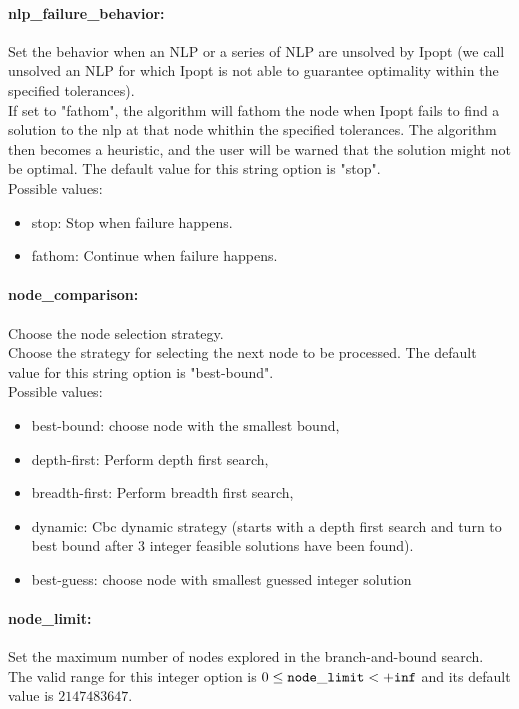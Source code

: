 \paragraph{nlp\_failure\_behavior:}\label{sec:nlp_failure_behavior} Set the behavior when an NLP or a series of NLP are unsolved by Ipopt (we call unsolved an NLP for which Ipopt is not able to guarantee optimality within the specified tolerances). $\;$ \\
 If set to "fathom", the algorithm will fathom the
node when Ipopt fails to find a solution to the
nlp at that node whithin the specified
tolerances. The algorithm then becomes a
heuristic, and the user will be warned that the
solution might not be optimal.
The default value for this string option is "stop".
\\ 
Possible values:
\begin{itemize}
   \item stop: Stop when failure happens.
   \item fathom: Continue when failure happens.
\end{itemize}

\paragraph{node\_comparison:}\label{sec:node_comparison} Choose the node selection strategy. $\;$ \\
 Choose the strategy for selecting the next node
to be processed.
The default value for this string option is "best-bound".
\\ 
Possible values:
\begin{itemize}
   \item best-bound: choose node with the smallest bound,
   \item depth-first: Perform depth first search,
   \item breadth-first: Perform breadth first search,
   \item dynamic: Cbc dynamic strategy (starts with a depth first
search and turn to best bound after 3 integer
feasible solutions have been found).
   \item best-guess: choose node with smallest guessed integer
solution
\end{itemize}

\paragraph{node\_limit:}\label{sec:node_limit} Set the maximum number of nodes explored in the branch-and-bound search. $\;$ \\
 The valid range for this integer option is
$0 \le {\tt node\_limit } <  {\tt +inf}$
and its default value is $2147483647$.


